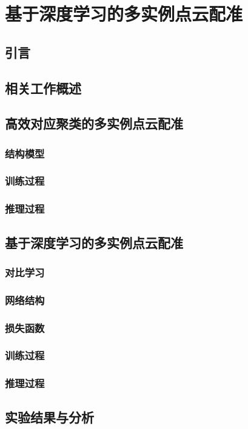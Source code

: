 \chapter{基于深度学习的多实例点云配准}

\section{引言}
\section{相关工作概述}
\section{高效对应聚类的多实例点云配准}
\subsection{结构模型}
\subsection{训练过程}
\subsection{推理过程}

\section{基于深度学习的多实例点云配准}
\subsection{对比学习}
\subsection{网络结构}
\subsection{损失函数}
\subsection{训练过程}
\subsection{推理过程}

\section{实验结果与分析}
